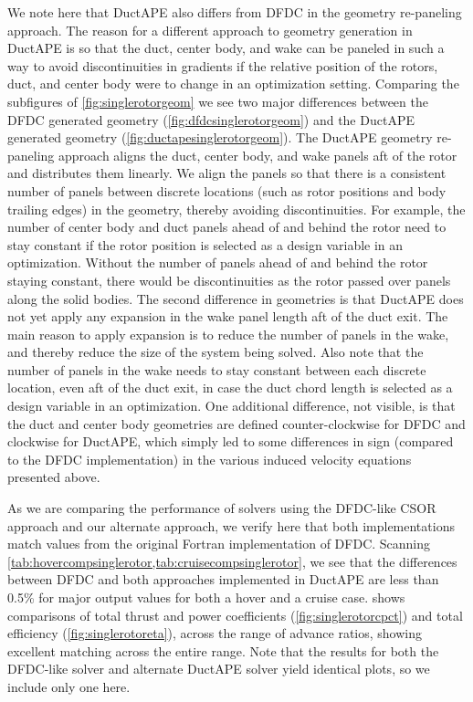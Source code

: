 We note here that DuctAPE also differs from DFDC in the geometry re-paneling approach.
%
The reason for a different approach to geometry generation in DuctAPE is so that the duct, center body, and wake can be paneled in such a way to avoid discontinuities in gradients if the relative position of the rotors, duct, and center body were to change in an optimization setting.
%
Comparing the subfigures of \cref{fig:singlerotorgeom} we see two major differences between the DFDC generated geometry (\cref{fig:dfdcsinglerotorgeom}) and the DuctAPE generated geometry (\cref{fig:ductapesinglerotorgeom}).
%
The DuctAPE geometry re-paneling approach aligns the duct, center body, and wake panels aft of the rotor and distributes them linearly.
%
We align the panels so that there is a consistent number of panels between discrete locations (such as rotor positions and body trailing edges) in the geometry, thereby avoiding discontinuities.
%
For example, the number of center body and duct panels ahead of and behind the rotor need to stay constant if the rotor position is selected as a design variable in an optimization.
%
Without the number of panels ahead of and behind the rotor staying constant, there would be discontinuities as the rotor passed over panels along the solid bodies.
%
 The second difference in geometries is that DuctAPE does not yet apply any expansion in the wake panel length aft of the duct exit. %
%
 The main reason to apply expansion is to reduce the number of panels in the wake, and thereby reduce the size of the system being solved.
%
%
 Also note that the number of panels in the wake needs to stay constant between each discrete location, even aft of the duct exit, in case the duct chord length is selected as a design variable in an optimization.
%
 One additional difference, not visible, is that the duct and center body geometries are defined counter-clockwise for DFDC and clockwise for DuctAPE, which simply led to some differences in sign (compared to the DFDC implementation) in the various induced velocity equations presented above.

As we are comparing the performance of solvers using the DFDC-like CSOR approach and our alternate approach, we verify here that both implementations match values from the original Fortran implementation of DFDC.
%
Scanning \cref{tab:hovercompsinglerotor,tab:cruisecompsinglerotor}, we see that the differences between DFDC and both approaches implemented in DuctAPE are less than 0.5\% for major output values for both a hover and a cruise case.
%
 shows comparisons of total thrust and power coefficients (\cref{fig:singlerotorcpct}) and total efficiency (\cref{fig:singlerotoreta}), across the range of advance ratios, showing excellent matching across the entire range.
%
Note that the results for both the DFDC-like solver and alternate DuctAPE solver yield identical plots, so we include only one here.

